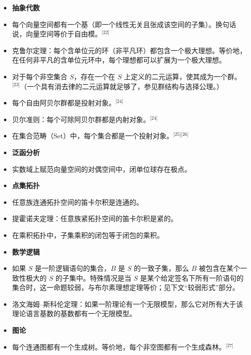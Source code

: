 \begin{itemize}
\item \textbf{抽象代数}  
\item 每个向量空间都有一个基（即一个线性无关且张成该空间的子集）。换句话说，向量空间等价于自由模。\(^\text{[22]}\)  
\item 克鲁尔定理：每个含单位元的环（非平凡环）都包含一个极大理想。等价地，在任何非平凡的含单位元环中，每个理想都可以扩展为一个极大理想。  
\item 对于每个非空集合 \(S\)，存在一个在 \(S\) 上定义的二元运算，使其成为一个群。\(^\text{[23]}\)（一个具有消去律的二元运算就足够了，参见群结构与选择公理。）  
\item 每个自由阿贝尔群都是投射对象。\(^\text{[24]}\)  
\item 贝尔准则：每个可除阿贝尔群都是内射对象。\(^\text{[24]}\)  
\item 在集合范畴（Set）中，每个集合都是一个投射对象。\(^\text{[25][26]}\)
\end{itemize}  

\begin{itemize}
\item \textbf{泛函分析} 
\item 实数域上赋范向量空间的对偶空间中，闭单位球存在极点。
\end{itemize}

\begin{itemize}
\item \textbf{点集拓扑}  
\item 任意族连通拓扑空间的笛卡尔积是连通的。  
\item 提霍诺夫定理：任意族紧拓扑空间的笛卡尔积是紧的。  
\item 在乘积拓扑中，子集乘积的闭包等于闭包的乘积。
\end{itemize}

\begin{itemize}
\item \textbf{数学逻辑}  
\item 如果 \(S\) 是一阶逻辑语句的集合，\(B\) 是 \(S\) 的一致子集，那么 \(B\) 被包含在某个一致性极大的 \(S\) 的子集中。特殊情况是当 \(S\) 是某个给定签名下所有一阶语句的集合时，这一命题较弱，与布尔素理想定理等价；见下文“较弱形式”部分。  
\item 洛文海姆–斯科伦定理：如果一阶理论有一个无限模型，那么它对所有大于该理论语言基数的基数都有一个无限模型。
\end{itemize}

\begin{itemize}
\item \textbf{图论}  
\item 每个连通图都有一个生成树。等价地，每个非空图都有一个生成森林。\(^\text{[27]}\)
\end{itemize}
